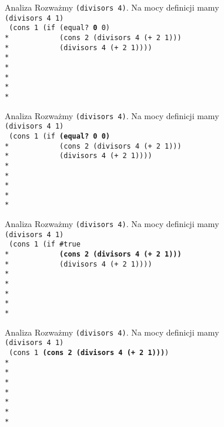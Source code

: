 \begin{frame}{Analiza}
  Rozważmy \texttt{(divisors 4)}. Na mocy definicji mamy\\
  \texttt{(divisors 4 1)}\\
  \texttt{
(cons 1 (if (equal?\ \textbf{0} 0)\\*
\ \ \ \ \ \ \ \ \ \ \ (cons 2 (divisors 4 (+ 2 1)))\\*
\ \ \ \ \ \ \ \ \ \ \ (divisors 4 (+ 2 1))))\\*
    \ \\*
    \ \\*
    \ \\*
    \ \\*
  }
\end{frame}

\begin{frame}{Analiza}
  Rozważmy \texttt{(divisors 4)}. Na mocy definicji mamy\\
  \texttt{(divisors 4 1)}\\
  \texttt{
(cons 1 (if \textbf{(equal?\ 0 0)}\\*
\ \ \ \ \ \ \ \ \ \ \ (cons 2 (divisors 4 (+ 2 1)))\\*
\ \ \ \ \ \ \ \ \ \ \ (divisors 4 (+ 2 1))))\\*
    \ \\*
    \ \\*
    \ \\*
    \ \\*
  }
\end{frame}

\begin{frame}{Analiza}
  Rozważmy \texttt{(divisors 4)}. Na mocy definicji mamy\\
  \texttt{(divisors 4 1)}\\
  \texttt{
(cons 1 (if \#true\\*
\ \ \ \ \ \ \ \ \ \ \ \textbf{(cons 2 (divisors 4 (+ 2 1)))}\\*
\ \ \ \ \ \ \ \ \ \ \ (divisors 4 (+ 2 1))))\\*
    \ \\*
    \ \\*
    \ \\*
    \ \\*
  }
\end{frame}

\begin{frame}{Analiza}
  Rozważmy \texttt{(divisors 4)}. Na mocy definicji mamy\\
  \texttt{(divisors 4 1)}\\
  \texttt{
(cons 1 \textbf{(cons 2 (divisors 4 (+ 2 1)))})\\*
    \ \\*
    \ \\*
    \ \\*
    \ \\*
    \ \\*
    \ \\*
  }
\end{frame}


